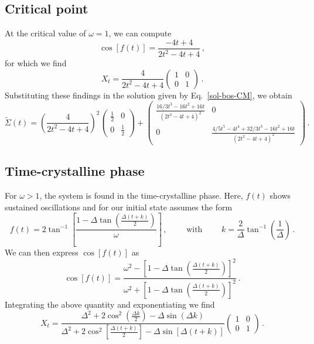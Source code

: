 \documentclass[prl,superscriptaddress,showpacs,longbibliography,reprint]{revtex4-2}
\begin{document}
\subsection{Critical point}
At the critical value of $\omega=1$, we can compute
$$
\cos[f(t)]=\frac{-4t +4}{2t^2-4t+4}\, ,
$$
for which we find 
$$
X_t=\frac{4}{2t^2-4t+4}\begin{pmatrix}
1&0\\0&1
\end{pmatrix}\, .
$$
Substituting these findings in the solution given by Eq.~\eqref{sol-bos-CM}, we obtain 
$$
\tilde{\Sigma}(t)=\left(\frac{4}{2t^2-4t+4}\right)^2\begin{pmatrix}
\frac{1}{2}&0\\0&\frac{1}{2}
\end{pmatrix}+\begin{pmatrix}
\frac{16/3 t^3-16t^2+16t}{\left(2t^2-4t+4\right)^2}&0\\0&\frac{4/5 t^5-4t^4+32/3t^3-16t^2+16t}{\left(2t^2-4t+4\right)^2}
\end{pmatrix}\, .
$$


\subsection{Time-crystalline phase}
For $\omega>1$, the system is found in the time-crystalline phase. Here, $f(t)$ shows sustained oscillations and for our initial state assumes the form 
$$
f(t)=2\tan^{-1}\left[\frac{1-\Delta \tan\left(\frac{\Delta(t+k)}{2}\right)}{\omega}\right]\, , \qquad \mbox{ with }  \qquad k=\frac{2}{\Delta}\tan^{-1} \left(\frac{1}{\Delta}\right)\, .
$$
We can then express $\cos[f(t)]$ as 
$$
\cos[f(t)]=\frac{\omega^2-\left[1-\Delta \tan\left(\frac{\Delta(t+k)}{2}\right)\right]^2}{\omega^2+\left[1-\Delta \tan\left(\frac{\Delta(t+k)}{2}\right)\right]^2}\, .
$$
Integrating the above quantity and exponentiating we find 
$$
X_t=\frac{\Delta^2 +2\cos^2\left(\frac{\Delta k}{2}\right)-\Delta \sin(\Delta k)}{\Delta^2 +2\cos^2\left[\frac{\Delta (t+k)}{2}\right]-\Delta \sin\left[\Delta (t+k)\right]}\begin{pmatrix}
1&0\\0&1
\end{pmatrix}\, .
$$
\end{document}

